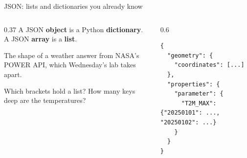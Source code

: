 \documentclass[9pt,aspectratio=169]{beamer}
\begin{document}
\begin{frame}[fragile]{JSON: lists and dictionaries you already know}
    \begin{columns}[T]
        \begin{column}{0.37\textwidth}
            A JSON \textbf{object} is a Python \textbf{dictionary}. A JSON \textbf{array} is a \textbf{list}.

            \medskip
            The shape of a weather answer from NASA's POWER API, which Wednesday's lab takes apart.

            \medskip
            Which brackets hold a list? How many keys deep are the temperatures?
        \end{column}
        \begin{column}{0.6\textwidth}
\begin{lstlisting}
{
  "geometry": {
    "coordinates": [...]
  },
  "properties": {
    "parameter": {
      "T2M_MAX": {"20250101": ..., "20250102": ...}
    }
  }
}
\end{lstlisting}
        \end{column}
    \end{columns}
\end{frame}
\end{document}
